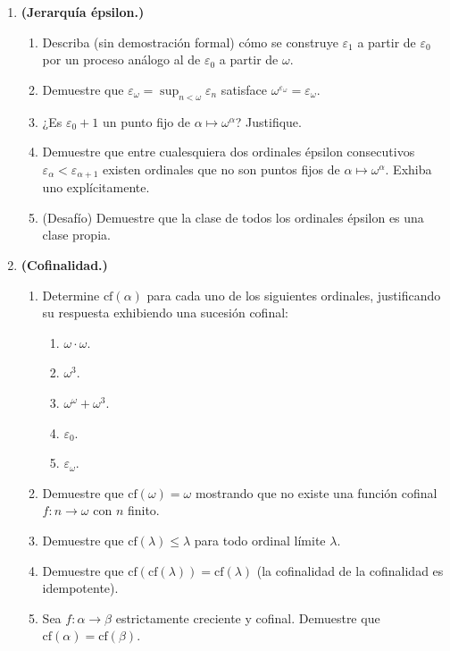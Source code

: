 \begin{enumerate}[leftmargin=2.5em, label=\textbf{\arabic*.}]
  \item \textbf{(Jerarquía épsilon.)}
  \begin{enumerate}[label=(\alph*)]
    \item Describa (sin demostración formal) cómo se construye $\varepsilon_1$ a partir de $\varepsilon_0$ por un proceso análogo al de $\varepsilon_0$ a partir de $\omega$.
    \item Demuestre que $\varepsilon_\omega = \sup_{n < \omega} \varepsilon_n$ satisface $\omega^{\varepsilon_\omega} = \varepsilon_\omega$.
    \item ¿Es $\varepsilon_0 + 1$ un punto fijo de $\alpha \mapsto \omega^\alpha$? Justifique.
    \item Demuestre que entre cualesquiera dos ordinales épsilon consecutivos $\varepsilon_\alpha < \varepsilon_{\alpha+1}$ existen ordinales que no son puntos fijos de $\alpha \mapsto \omega^\alpha$. Exhiba uno explícitamente.
    \item (Desafío) Demuestre que la clase de todos los ordinales épsilon es una clase propia.
  \end{enumerate}

  \item \textbf{(Cofinalidad.)}
  \begin{enumerate}[label=(\alph*)]
    \item Determine $\mathrm{cf}(\alpha)$ para cada uno de los siguientes ordinales, justificando su respuesta exhibiendo una sucesión cofinal:
    \begin{enumerate}[label=(\roman*)]
      \item $\omega \cdot \omega$.
      \item $\omega^3$.
      \item $\omega^\omega + \omega^3$.
      \item $\varepsilon_0$.
      \item $\varepsilon_\omega$.
    \end{enumerate}
    \item Demuestre que $\mathrm{cf}(\omega) = \omega$ mostrando que no existe una función cofinal $f: n \to \omega$ con $n$ finito.
    \item Demuestre que $\mathrm{cf}(\lambda) \leq \lambda$ para todo ordinal límite $\lambda$.
    \item Demuestre que $\mathrm{cf}(\mathrm{cf}(\lambda)) = \mathrm{cf}(\lambda)$ (la cofinalidad de la cofinalidad es idempotente).
    \item Sea $f: \alpha \to \beta$ estrictamente creciente y cofinal. Demuestre que $\mathrm{cf}(\alpha) = \mathrm{cf}(\beta)$.
  \end{enumerate}


\end{enumerate}

